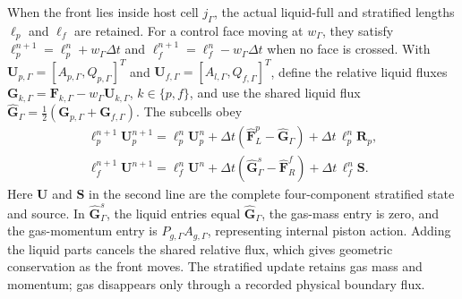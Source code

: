 When the front lies inside host cell $j_\Gamma$, the actual liquid-full and
stratified lengths $\ell_p$ and $\ell_f$ are retained. For a control face moving
at $w_\Gamma$, they satisfy
$\ell_p^{n+1}=\ell_p^n+w_\Gamma\Delta t$ and
$\ell_f^{n+1}=\ell_f^n-w_\Gamma\Delta t$ when no face is crossed. With
$\mathbf U_{p,\Gamma}=[A_{p,\Gamma},Q_{p,\Gamma}]^{T}$ and
$\mathbf U_{f,\Gamma}=[A_{l,\Gamma},Q_{f,\Gamma}]^{T}$, define the
relative liquid fluxes
$\mathbf G_{k,\Gamma}=\mathbf F_{k,\Gamma}
-w_\Gamma\mathbf U_{k,\Gamma}$, $k\in\{p,f\}$, and use the shared liquid
flux $\widehat{\mathbf G}_\Gamma
=\tfrac12(\mathbf G_{p,\Gamma}+\mathbf G_{f,\Gamma})$. The subcells obey
\begin{equation}
\begin{gathered}
\ell_p^{n+1}\mathbf U_p^{n+1}
=\ell_p^n\mathbf U_p^n
+\Delta t(\widehat{\mathbf F}_{L}^{p}
-\widehat{\mathbf G}_\Gamma)
+\Delta t\,\ell_p^n\mathbf R_p,\\[3pt]
\ell_f^{n+1}\mathbf U^{n+1}
=\ell_f^n\mathbf U^n
+\Delta t(\widehat{\mathbf G}_\Gamma^{s}
-\widehat{\mathbf F}_{R}^{f})
+\Delta t\,\ell_f^n\mathbf S.
\end{gathered}
\label{eq:cutcell_update}
\end{equation}
Here $\mathbf U$ and $\mathbf S$ in the second line are the complete
four-component stratified state and source. In
$\widehat{\mathbf G}_\Gamma^s$, the liquid entries equal
$\widehat{\mathbf G}_\Gamma$, the gas-mass entry is zero, and the gas-momentum
entry is $P_{g,\Gamma}A_{g,\Gamma}$, representing internal piston action.
Adding the liquid parts cancels the shared relative flux, which gives geometric
conservation as the front moves. The stratified update retains gas mass and
momentum; gas disappears only through a recorded physical boundary flux.

